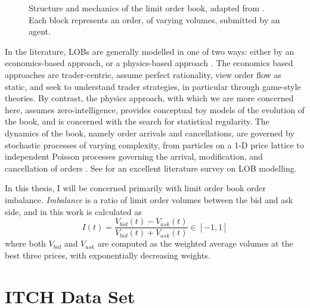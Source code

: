 \begin{figure}
  
\caption{Structure and mechanics of the limit order book, adapted from \cite{Booth15}. Each block represents an order, of varying volumes, submitted by an agent.}
\label{fig:LOB}
\end{figure}

In the literature, LOBs are generally modelled in one of two ways: either by an economics-based approach, or a physics-based approach \cite{Summary2013}. The economics based approaches are trader-centric, assume perfect rationality, view order flow as static, and seek to understand trader strategies, in particular through game-style theories. By contrast, the physics approach, with which we are more concerned here, assumes zero-intelligence, provides conceptual toy models of the evolution of the book, and is concerned with the search for statistical regularity. The dynamics of the book, namely order arrivals and cancellations, are governed by stochastic processes of varying complexity, from particles on a 1-D price lattice \cite{Bak97} to independent Poisson processes governing the arrival, modification, and cancellation of orders \cite{Cont10}. See \cite{Summary2013} for an excellent literature survey on LOB modelling.

In this thesis, I will be concerned primarily with limit order book order imbalance. \emph{Imbalance} is a ratio of limit order volumes between the bid and ask side, and in this work is calculated as 
\begin{equation}\label{eq:LOBImbalance}
I(t) = \dfrac{V_{bid}(t) - V_{ask}(t)}{V_{bid}(t) + V_{ask}(t)} \in [-1,1]
\end{equation}
where both $V_{bid}$ and $V_{ask}$ are computed as the weighted average volumes at the best three prices, with exponentially decreasing weights.

\section{ITCH Data Set}
